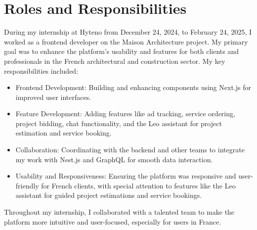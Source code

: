 \section{Roles and Responsibilities}
During my internship at Hyteno from December 24, 2024, to February 24, 2025, I worked as a frontend developer on the Maison Architecture project. My primary goal was to enhance the platform’s usability and features for both clients and professionals in the French architectural and construction sector. My key responsibilities included:
\begin{itemize}
    \item Frontend Development: Building and enhancing components using Next.js for improved user interfaces.
    \item Feature Development: Adding features like ad tracking, service ordering, project bidding, chat functionality, and the Leo assistant for project estimation and service booking.
    \item Collaboration: Coordinating with the backend and other teams to integrate my work with Nest.js and GraphQL for smooth data interaction.
    \item Usability and Responsiveness: Ensuring the platform was responsive and user-friendly for French clients, with special attention to features like the Leo assistant for guided project estimations and service bookings.
\end{itemize}
Throughout my internship, I collaborated with a talented team to make the platform more intuitive and user-focused, especially for users in France.

